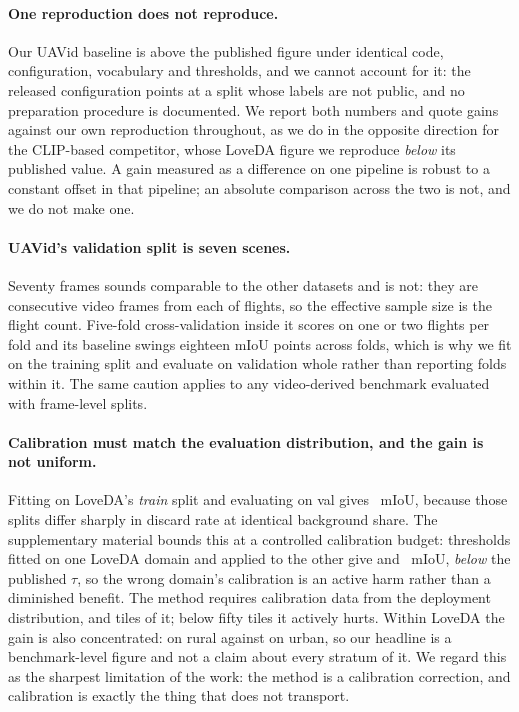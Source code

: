 \documentclass[10pt,a4paper]{article}                        %
\begin{document}
\paragraph{One reproduction does not reproduce.} Our UAVid baseline is \uavGap{}
above the published figure under identical code, configuration, vocabulary and
thresholds, and we cannot account for it: the released configuration points at a
split whose labels are not public, and no preparation procedure is documented. We
report both numbers and quote gains against our own reproduction throughout, as we do
in the opposite direction for the CLIP-based competitor, whose LoveDA figure we
reproduce \cnGap{} \emph{below} its published value. A gain measured as a difference
on one pipeline is robust to a constant offset in that pipeline; an absolute
comparison across the two is not, and we do not make one.

\paragraph{UAVid's validation split is seven scenes.} Seventy frames sounds
comparable to the other datasets and is not: they are \uavFrames{} consecutive video
frames from each of \uavValScenes{} flights, so the effective sample size is the
flight count. Five-fold cross-validation inside it scores on one or two flights per
fold and its baseline swings eighteen mIoU points across folds, which is why we fit
on the training split and evaluate on validation whole rather than reporting folds
within it. The same caution applies to any video-derived benchmark evaluated with
frame-level splits.

\paragraph{Calibration must match the evaluation distribution, and the gain is
not uniform.} Fitting on LoveDA's \emph{train} split and evaluating on val gives
\trainToVal{}~mIoU, because those splits differ sharply in discard rate at
identical background share. The supplementary material bounds this at a
controlled calibration budget: thresholds fitted on one LoveDA domain and applied to the
other give \DOMxr{} and \DOMxu{}~mIoU, \emph{below} the published $\tau$, so the
wrong domain's calibration is an active harm rather than a diminished benefit.
The method requires calibration data from the deployment distribution, and
\calibTiles{} tiles of it; below fifty tiles it actively hurts. Within LoveDA the
gain is also concentrated: \DOMr{} on rural against \DOMu{} on urban, so our
headline \methodGain{} is a benchmark-level figure and not a claim about every
stratum of it. We regard this as the sharpest limitation of the work: the method
is a calibration correction, and calibration is exactly the thing that does not
transport.
\end{document}
